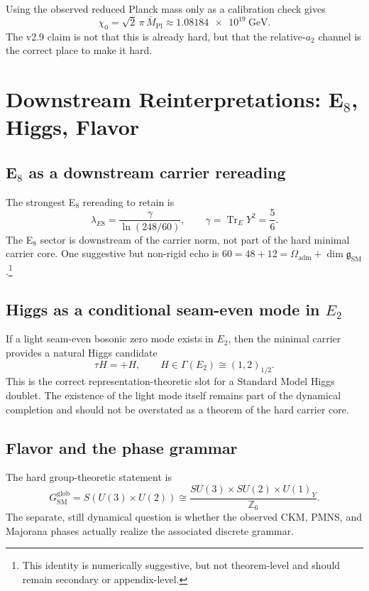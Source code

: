 \documentclass[11pt,a4paper]{article}
\theoremstyle{definition}
\theoremstyle{remark}
\newcommand{\Mpl}{\bar M_{\mathrm{Pl}}}
\newcommand{\tr}{\operatorname{Tr}}
\newcommand{\SM}{\mathrm{SM}}
\newcommand{\Oadm}{\Omega_{\mathrm{adm}}}
\begin{document}
Using the observed reduced Planck mass only as a calibration check gives
\[
\chi_0 = \sqrt2\,\pi\,\Mpl \approx \num{1.08184e19}\ \mathrm{GeV}.
\]
The v2.9 claim is not that this is already hard, but that the relative-$a_2$ channel is the correct place to make it hard.

\section{Downstream Reinterpretations: \texorpdfstring{E$_8$}{E8}, Higgs, Flavor}

\subsection{\texorpdfstring{E$_8$}{E8} as a downstream carrier rereading}

The strongest E$_8$ rereading to retain is
\[
\lambda_{E8}=\frac{\gamma}{\ln(248/60)},
\qquad
\gamma=\tr_EY^2=\frac56.
\]
The E$_8$ sector is downstream of the carrier norm, not part of the hard minimal carrier core. One suggestive but non-rigid echo is $60=48+12=\Oadm+\dim\mathfrak g_{\SM}$.\footnote{This identity is numerically suggestive, but not theorem-level and should remain secondary or appendix-level.}

\subsection{Higgs as a conditional seam-even mode in \texorpdfstring{$E_2$}{E2}}

If a light seam-even bosonic zero mode exists in $E_2$, then the minimal carrier provides a natural Higgs candidate
\[
\tau H = +H,
\qquad
H\in \Gamma(E_2)\cong (1,2)_{1/2}.
\]
This is the correct representation-theoretic slot for a Standard Model Higgs doublet. The existence of the light mode itself remains part of the dynamical completion and should not be overstated as a theorem of the hard carrier core.

\subsection{Flavor and the phase grammar}

The hard group-theoretic statement is
\[
G_{\mathrm{SM}}^{\mathrm{glob}}
=
S(U(3)\times U(2))
\cong \frac{SU(3)\times SU(2)\times U(1)_Y}{\mathbb Z_6}.
\]
The separate, still dynamical question is whether the observed CKM, PMNS, and Majorana phases actually realize the associated discrete grammar.
\end{document}
